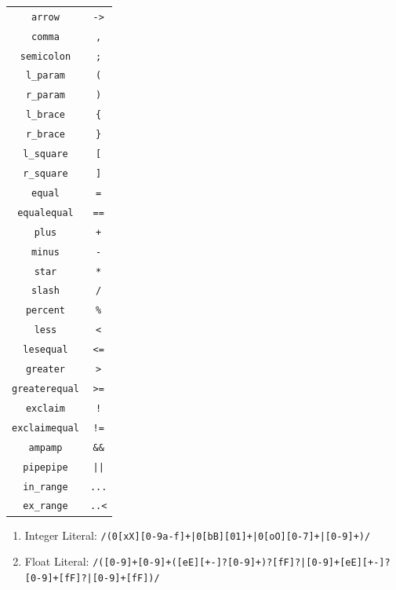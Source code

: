 \documentclass[11pt]{book}
\begin{document}
\begin{table}[H]
\begin{tabular}{|c|c|}
    \texttt{arrow} & \texttt{->} \\
    \texttt{comma} & \texttt{,} \\
    \texttt{semicolon} & \texttt{;} \\
    \texttt{l\_param} & \texttt{(} \\
    \texttt{r\_param} & \texttt{)} \\
    \texttt{l\_brace} & \texttt{\{} \\
    \texttt{r\_brace} & \texttt{\}} \\
    \texttt{l\_square} & \texttt{[} \\
    \texttt{r\_square} & \texttt{]} \\
    \texttt{equal} & \texttt{=} \\
    \texttt{equalequal} & \texttt{==} \\
    \texttt{plus} & \texttt{+} \\
    \texttt{minus} & \texttt{-} \\
    \texttt{star} & \texttt{*} \\
    \texttt{slash} & \texttt{/} \\
    \texttt{percent} & \texttt{\%} \\
    \texttt{less} & \texttt{<} \\
    \texttt{lesequal} & \texttt{<=} \\
    \texttt{greater} & \texttt{>} \\
    \texttt{greaterequal} & \texttt{>=} \\
    \texttt{exclaim} & \texttt{!} \\
    \texttt{exclaimequal} & \texttt{!=} \\
    \texttt{ampamp} & \texttt{\&\&} \\
    \texttt{pipepipe} & \texttt{||} \\
    \texttt{in\_range} & \texttt{...} \\
    \texttt{ex\_range} & \texttt{..<} \\
    \hline
  \end{tabular}
\end{table}

\begin{enumerate}[label=\thesection.\arabic*]
  \item \label{item:lr_int_literal} Integer Literal: \texttt{/(0[xX][0-9a-f]+|0[bB][01]+|0[oO][0-7]+|[0-9]+)/}
  \item \label{item:lr_float_literal} Float Literal: {\small \texttt{/([0-9]+\.[0-9]+([eE][+-]?[0-9]+)?[fF]?|[0-9]+[eE][+-]?[0-9]+[fF]?|[0-9]+[fF])/}}
\end{enumerate}
\end{document}
